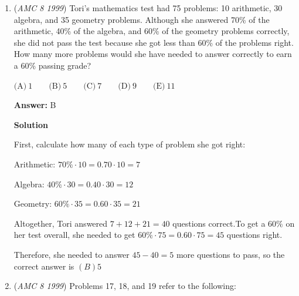 \begin{enumerate}
 As before, the answer is $5 \cdot 5 \cdot 4 - 5 \cdot 3 \cdot 4 = 40$, and the correct choice is $\boxed{D}$




\textbf{Solution 3}

Before new letters were added, five different letters could have been chosen for the first position, three for the second, and four for the third. This means that $5\cdot 3\cdot 4=60$ plates could have been made.

 If two letters are added to the second set, then $5\cdot 5\cdot 4=100$ plates can be made. If one letter is added to each of the second and third sets, then $5\cdot 4\cdot 5=100$ plates can be made. None of the other four ways to place the two letters will create as many plates. So, $100-60=\boxed{40}$ ADDITIONAL plates can be made.So the correct choice is $\boxed{D}$



	\item (\textit{AMC 8 1999}) Tori's mathematics test had 75 problems: 10 arithmetic, 30 algebra, and 35 geometry problems. Although she answered 70\% of the arithmetic, 40\% of the algebra, and 60\% of the geometry problems correctly, she did not pass the test because she got less than 60\% of the problems right. How many more problems would she have needed to answer correctly to earn a 60\% passing grade?


 $\text{(A)}\ 1 \qquad \text{(B)}\ 5 \qquad \text{(C)}\ 7 \qquad \text{(D)}\ 9 \qquad \text{(E)}\ 11$

 \textbf{Answer: }B



\textbf{Solution}

First, calculate how many of each type of problem she got right:

 Arithmetic:  $70\% \cdot 10 = 0.70 \cdot 10 = 7$

 Algebra:  $40\% \cdot 30 = 0.40 \cdot 30 = 12$

 Geometry:  $60\% \cdot 35 = 0.60 \cdot 35 =  21$

 Altogether, Tori answered $7 + 12 + 21 = 40$ questions correct.To get a $60\%$ on her test overall, she needed to get $60\% \cdot 75 = 0.60 \cdot 75 = 45$ questions right.

 Therefore, she needed to answer $45 - 40 = 5$ more questions to pass, so the correct answer is $\boxed{(B) 5}$



	\item (\textit{AMC 8 1999}) Problems 17, 18, and 19 refer to the following:



\end{enumerate}

